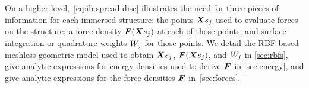 On a higher level,~\eqref{eq:ib-spread-disc} illustrates the need for three pieces of information for each
immersed structure: the points $\Xsj$ used to evaluate forces on the structure; a force density $\F(\Xsj)$ at each
of those points; and surface integration or quadrature weights $\weight[j]$ for those points. We detail the
RBF-based meshless geometric model used to obtain $\Xsj$, $\F(\Xsj)$, and $\weight[j]$ in \cref{sec:rbfs}, give
analytic expressions for energy densities used to derive $\boldsymbol{F}$ in \cref{sec:energy}, and give analytic expressions
for the force densities $\boldsymbol{F}$ in~\ref{sec:forces}.
